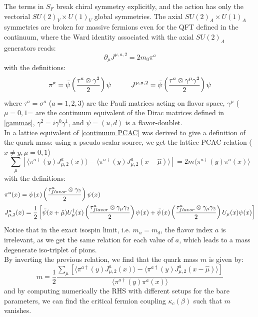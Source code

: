 The terms in $S_F$ break chiral symmetry explicitly, and the action has only the vectorial $SU(2)_V \times U(1)_V$ global symmetries. The axial $SU(2)_A \times U(1)_A$ symmetries are broken for massive fermions even for the QFT defined in the continuum, where the Ward identity associated with the axial $SU(2)_A$ generators reads:
\begin{equation}\label{continuum PCAC}
    \partial_\mu J^{\mu, a, 2} = 2 m_0 \pi^a
\end{equation}
with the definitions:
\begin{equation}
    \pi^a = \Bar{\psi} \left(\frac{\tau^a \otimes \gamma^{2}}{2}\right) \psi \hspace{10mm} J^{\mu, a, 2} = \Bar{\psi} \left(\frac{\tau^a \otimes \gamma^{\mu} \gamma^{2}}{2}\right) \psi
\end{equation}
where $\tau^a = \sigma^a$ ($a = 1, 2, 3$) are the Pauli matrices acting on flavor space, $\gamma^{\mu}$ ($\mu = 0, 1$= are the continuum equivalent of the Dirac matrices defined in \eqref{gammas}, $\gamma^2 = i\gamma^0\gamma^1$, and $\psi = (u, d)$ is a flavor-doublet.
\\ In \cite{Hip_1998} a lattice equivalent of \eqref{continuum PCAC} was derived to give a definition of the quark mass: using a pseudo-scalar source, we get the lattice PCAC-relation ($x \neq y, \mu = 0, 1$)
\begin{equation}\label{PCAC}
    \sum_\mu \left[ \langle \pi^{a \dagger} (y) J^{a}_{\mu, 2} (x) \rangle - \langle \pi^{a \dagger} (y) J^{a}_{\mu, 2} (x - \hat{\mu}) \rangle \right] = 2m \langle \pi^{a \dagger} (y) \pi^{a} (x) \rangle 
\end{equation}
with the definitions:
\begin{equation}
\begin{split}
   & \pi^a(x) = \Bar{\psi}(x) \left(\frac{\tau^a_{flavor} \otimes \gamma_{2}}{2}\right) \psi(x) \\
   & J^{a}_{\mu, 2}(x) = \frac{1}{2} \left[\Bar{\psi}(x + \hat{\mu}) U^\dagger_\mu(x) \left( \frac{\tau^a_{flavor} \otimes \gamma_\mu \gamma_2}{2} \right) \psi(x) + \Bar{\psi}(x) \left( \frac{\tau^a_{flavor} \otimes \gamma_\mu \gamma_2}{2} \right) U_\mu(x) \psi(x)\right]     
\end{split}
\end{equation}
Notice that in the exact isospin limit, i.e. $m_u = m_d$, the flavor index $a$ is irrelevant, as we get the same relation for each value of $a$, which leads to a mass degenerate iso-triplet of pions. 
\\ By inverting the previous relation, we find that the quark mass $m$ is given by:
\begin{equation}\label{mass}
    m = \frac{1}{2} \frac{\sum_\mu \left[ \langle \pi^{a \dagger} (y) J^{a}_{\mu, 2} (x) \rangle - \langle \pi^{a \dagger} (y) J^{a}_{\mu, 2} (x - \hat{\mu}) \rangle \right]}{\langle \pi^{a \dagger} (y) \pi^{a} (x) \rangle }
\end{equation}
and by computing numerically the RHS with different setups for the bare parameters, we can find the critical fermion coupling $\kappa_c(\beta)$ such that $m$ vanishes.


